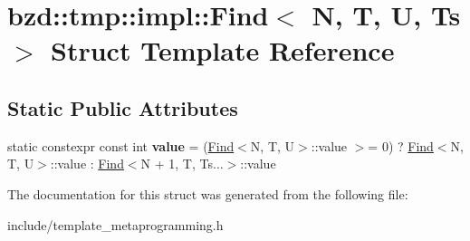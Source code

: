 \hypertarget{structbzd_1_1tmp_1_1impl_1_1Find}{}\section{bzd\+:\+:tmp\+:\+:impl\+:\+:Find$<$ N, T, U, Ts $>$ Struct Template Reference}
\label{structbzd_1_1tmp_1_1impl_1_1Find}
\subsection*{Static Public Attributes}
\begin{DoxyCompactItemize}
\item 
\mbox{\label{structbzd_1_1tmp_1_1impl_1_1Find_a4b31f8729e9f22c61cb770506e5f8761}} 
static constexpr const int {\bfseries value} = (\hyperlink{structbzd_1_1tmp_1_1impl_1_1Find}{Find}$<$N, T, U$>$\+::value $>$= 0) ? \hyperlink{structbzd_1_1tmp_1_1impl_1_1Find}{Find}$<$N, T, U$>$\+::value \+: \hyperlink{structbzd_1_1tmp_1_1impl_1_1Find}{Find}$<$N + 1, T, Ts...$>$\+::value
\end{DoxyCompactItemize}


The documentation for this struct was generated from the following file\+:\begin{DoxyCompactItemize}
\item 
include/template\+\_\+metaprogramming.\+h\end{DoxyCompactItemize}

